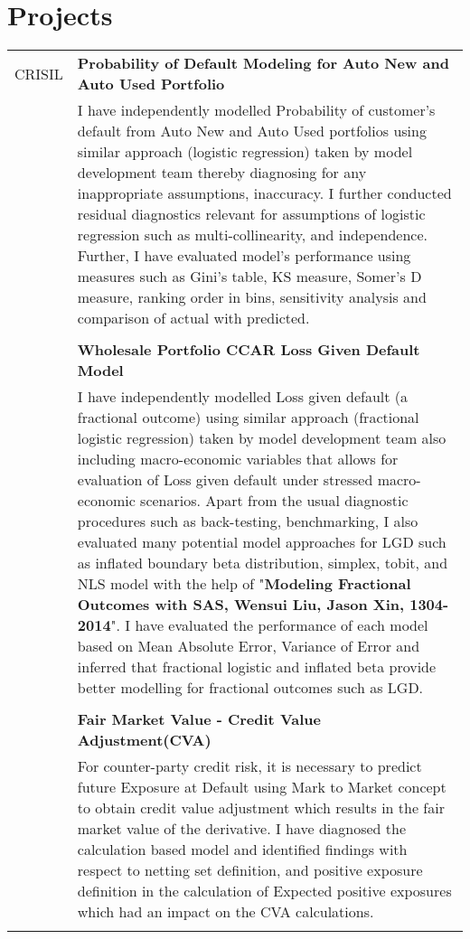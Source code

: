 \documentclass[a4paper,10pt]{article}
\begin{document}
\section{Projects}
\begin{tabular}{r|p{11cm}}
 \Large{CRISIL} 
  & \textbf{Probability of Default Modeling for Auto New and Auto Used Portfolio} \\ &\footnotesize{I have independently modelled Probability of customer's default from Auto New and Auto Used portfolios using similar approach (logistic regression) taken by model development team thereby diagnosing for any inappropriate assumptions, inaccuracy. I further conducted residual diagnostics relevant for assumptions of logistic regression such as multi-collinearity, and independence. Further, I have evaluated model's performance using measures such as Gini's table, KS measure, Somer's D measure, ranking order in bins, sensitivity analysis and comparison of actual with predicted. }\\\multicolumn{2}{c}{} \\
 
& \textbf{Wholesale Portfolio CCAR Loss Given Default Model} \\ &\footnotesize{I have independently modelled Loss given default (a fractional outcome) using similar approach (fractional logistic regression) taken by model development team also including macro-economic variables that allows for evaluation of Loss given default under stressed macro-economic scenarios. Apart from the usual diagnostic procedures such as back-testing, benchmarking, I also evaluated many potential model approaches for LGD such as inflated boundary beta distribution, simplex, tobit, and NLS model with the help of "\textbf{Modeling Fractional Outcomes with SAS, Wensui Liu, Jason Xin, 1304-2014}". I have evaluated the performance of each model based on Mean Absolute Error, Variance of Error and inferred that fractional logistic and inflated beta provide better modelling for fractional outcomes such as LGD. }\\\multicolumn{2}{c}{} \\

& \textbf{Fair Market Value - Credit Value Adjustment(CVA)} \\ &\footnotesize{For counter-party credit risk, it is necessary to predict future Exposure at Default using Mark to Market concept to obtain credit value adjustment which results in the fair market value of the derivative. I have diagnosed the calculation based model and identified findings with respect to netting set definition, and positive exposure definition in the calculation of Expected positive exposures which had an impact on the CVA calculations.  }\\\multicolumn{2}{c}{} \\


\end{tabular}
\end{document}
